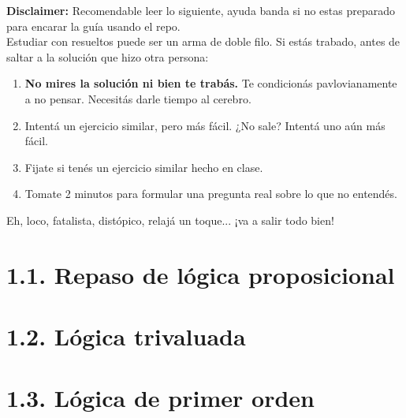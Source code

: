\begin{disclaimerbox}
\textbf{Disclaimer:} Recomendable leer lo siguiente, ayuda banda si no estas preparado para encarar la guía usando el repo. \\

Estudiar con resueltos puede ser un arma de doble filo. Si estás trabado, antes de saltar a la solución que hizo otra persona:
\begin{enumerate}
    \item \textbf{No mires la solución ni bien te trabás.} Te condicionás pavlovianamente a no pensar. Necesitás darle tiempo al cerebro.
    \item Intentá un ejercicio similar, pero más fácil. ¿No sale? Intentá uno aún más fácil.
    \item Fijate si tenés un ejercicio similar hecho en clase.
    \item Tomate 2 minutos para formular una pregunta real sobre lo que no entendés.
\end{enumerate}
Eh, loco, fatalista, distópico, relajá un toque... ¡va a salir todo bien!
\end{disclaimerbox}

\newpage

\section*{1.1. Repaso de lógica proposicional}







\section*{1.2. Lógica trivaluada}




\section*{1.3. Lógica de primer orden}



\vspace{1cm}





